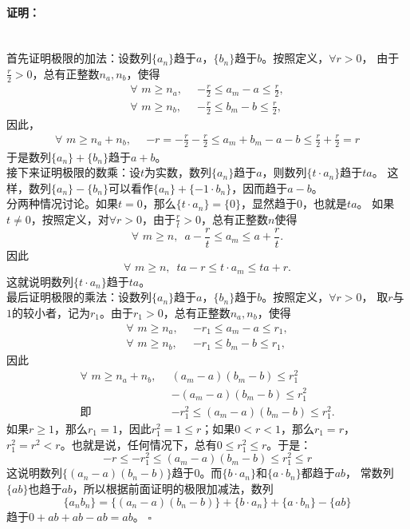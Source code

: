 \documentclass[12pt,UTF8]{ctexbook}
\renewenvironment{proof}{\paragraph{\textbf{证明：}}}{\hfill$\square$}
\begin{document}
\begin{proof}
    \mbox{} \\
    首先证明极限的加法：设数列$\{a_n\}$趋于$a$，$\{b_n\}$趋于$b$。按照定义，$\forall r > 0$，
    由于$\frac{r}{2}>0$，总有正整数$n_a, n_b$，使得
    \begin{align*}
        \forall \,\, m \geqslant n_a, \,\,\, & - \frac{r}{2} \leqslant a_m - a \leqslant \frac{r}{2},  \\
        \forall \,\, m \geqslant n_b, \,\,\, & - \frac{r}{2} \leqslant b_m - b \leqslant \frac{r}{2},  
    \end{align*}
    因此，
    \begin{align*}
        \forall \,\, m \geqslant n_a + n_b, \,\,\, & -r = - \frac{r}{2} - \frac{r}{2} \leqslant a_m + b_m - a - b \leqslant \frac{r}{2} + \frac{r}{2} = r  
    \end{align*}
    于是数列$\{a_n\} + \{b_n\}$趋于$a + b$。\\
    接下来证明极限的数乘：设$t$为实数，数列$\{a_n\}$趋于$a$，则数列$\{t\cdot a_n\}$趋于$ta$。
    这样，数列$\{a_n\} - \{b_n\}$可以看作$\{a_n\} + \{-1\cdot b_n\}$，因而趋于$a - b$。\\
    分两种情况讨论。如果$t=0$，那么$\{t\cdot a_n\} = \{0\}$，显然趋于$0$，也就是$ta$。
    如果$t \neq 0$，按照定义，对$\forall r > 0$，由于$\frac{r}{t} > 0$，总有正整数$n$使得
    $$ \forall \,\, m \geqslant n, \,\,\, a - \frac{r}{t} \leqslant a_m \leqslant a + \frac{r}{t}. $$
    因此
    $$ \forall \,\, m \geqslant n, \,\,\, ta - r \leqslant t\cdot a_m \leqslant ta + r. $$
    这就说明数列$\{t\cdot a_n\}$趋于$ta$。\\
    最后证明极限的乘法：设数列$\{a_n\}$趋于$a$，$\{b_n\}$趋于$b$。按照定义，$\forall r > 0$，
    取$r$与$1$的较小者，记为$r_1$。由于$r_1>0$，总有正整数$n_a, n_b$，使得
    \begin{align*}
        \forall \,\, m \geqslant n_a, \,\,\, & - r_1 \leqslant a_m - a \leqslant r_1,  \\
        \forall \,\, m \geqslant n_b, \,\,\, & - r_1 \leqslant b_m - b \leqslant r_1,  
    \end{align*}
    因此
    \begin{align*}
        \forall \,\, m \geqslant n_a + n_b, \,\,\, & (a_m - a)(b_m - b) \leqslant r_1^2   \\
        & -(a_m - a)(b_m - b) \leqslant r_1^2   \\
        \mbox{即 }\quad & - r_1^2 \leqslant (a_m - a)(b_m - b) \leqslant r_1^2.  
    \end{align*}
    如果$r\geqslant 1$，那么$r_1=1$，因此$r_1^2 = 1 \leqslant r$；如果$0 < r <1$，那么$r_1 = r$，
    $r_1^2 = r^2 < r$。也就是说，任何情况下，总有$0 \leqslant r_1^2 \leqslant r$。于是：
    $$ -r \leqslant - r_1^2 \leqslant (a_m - a)(b_m - b) \leqslant r_1^2 \leqslant r $$
    这说明数列$\{(a_n - a)(b_n - b)\}$趋于$0$。而$\{b\cdot a_n\}$和$\{a \cdot b_n\}$都趋于$ab$，
    常数列$\{ab\}$也趋于$ab$，所以根据前面证明的极限加减法，数列
    $$\{a_nb_n\} = \{(a_n - a)(b_n - b)\} + \{b\cdot a_n\} + \{a \cdot b_n\} - \{ab\}$$
    趋于$0 + ab + ab - ab = ab$。
\end{proof}
\end{document}
